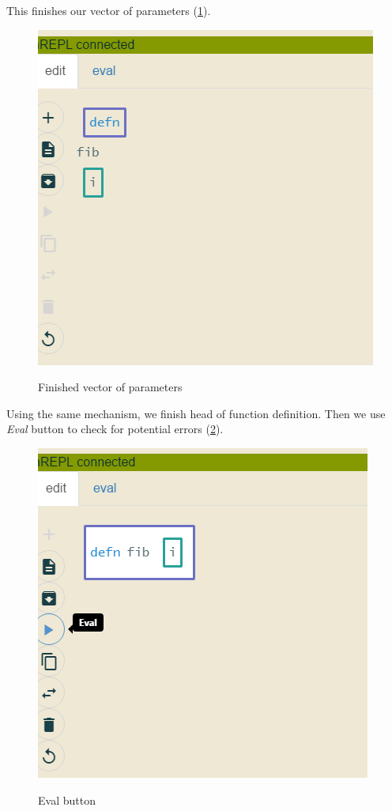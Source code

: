 \documentclass[11pt]{scrartcl}
\begin{document}
This finishes our vector of parameters (\ref{j-inserted}).

\begin{figure}[hbt]
  \includegraphics[scale=0.3]{img/j-inserted}
  \label{j-inserted}
  \caption{Finished vector of parameters}
\end{figure}

Using the same mechanism, we finish head of function definition. Then we use
\textit{Eval}  button to check for potential errors (\ref{j-defn-eval}).

\begin{figure}[hbt]
  \includegraphics[scale=0.3]{img/j-defn-eval}
  \label{j-defn-eval}
  \caption{Eval button}
\end{figure}
\end{document}
